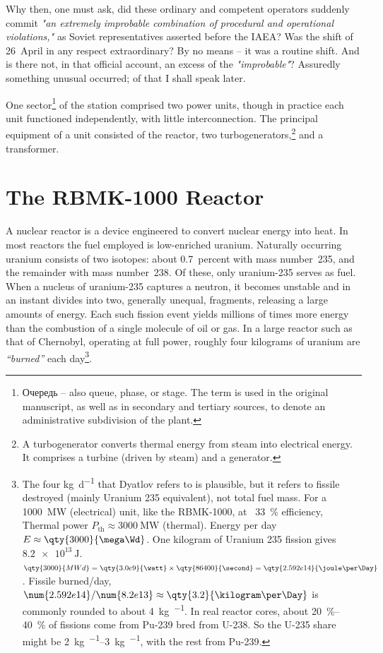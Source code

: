 \documentclass[openright]{bookest}
\begin{document}
Why then, one must ask, did these ordinary and competent operators suddenly commit \textit{"an extremely improbable combination of procedural and operational violations,"} as Soviet representatives asserted before the IAEA? Was the shift of 26~April in any respect extraordinary? By no means -- it was a routine shift. And is there not, in that official account, an excess of the \textit{"improbable"}? Assuredly something unusual occurred; of that I shall speak later.

One sector\footnote{Очередь -- also queue, phase, or stage. The term is used in the original manuscript, as well as in secondary and tertiary sources, to denote an administrative subdivision of the plant.} of the station comprised two power units, though in practice each unit functioned independently, with little interconnection. The principal equipment of a unit consisted of the reactor, two turbogenerators,\footnote{A turbogenerator converts thermal energy from steam into electrical energy. It comprises a turbine (driven by steam) and a generator.} and a transformer.

\section{The RBMK-1000 Reactor}

A nuclear reactor is a device engineered to convert nuclear energy into heat. In most reactors the fuel employed is low-enriched uranium. Naturally occurring uranium consists of two isotopes: about \num{0.7}~percent with mass number~235, and the remainder with mass number~238. Of these, only uranium-235 serves as fuel. When a nucleus of uranium-235 captures a neutron, it becomes unstable and in an instant divides into two, generally unequal, fragments, releasing a large amounts of energy. Each such fission event yields millions of times more energy than the combustion of a single molecule of oil or gas. In a large reactor such as that of Chernobyl, operating at full power, roughly four kilograms of uranium are \textit{``burned''} each day\footnote{The four \unit{\kilogram\per\day} that Dyatlov refers to is plausible, but it refers to fissile destroyed (mainly Uranium 235 equivalent), not total fuel mass. For a \qty{1000}{\mega\watt} (electrical) unit, like the RBMK-1000, at ~\qty{33}{\percent} efficiency, Thermal power $P_{\mathrm{th}}\approx \qty{3000}{\mega\watt}$ (thermal). Energy per day $E\approx \qty{3000}{\mega\Wd}$. One kilogram of Uranium 235 fission gives $\qty{8.2e13}{\joule}$. $\qty{3000}{MWd} = \qty{3.0e9}{\watt}\times\qty{86400}{\second}=\qty{2.592e14}{\joule\per\Day}$. Fissile burned/day, $\num{2.592e14} / \num{8.2e13} \approx \qty{3.2}{\kilogram\per\Day}$ is commonly rounded to about \qty{4}{\kilogram\per\Day}. In real reactor cores, about \qtyrange{20}{40}{\percent} of fissions come from Pu-239 bred from U-238. So the U-235 share might be \qtyrange[range-open-phrase={\text{between} },range-phrase={ \text{and} }]{2}{3}{\kilogram\per\Day}, with the rest from Pu-239.}.
\end{document}
